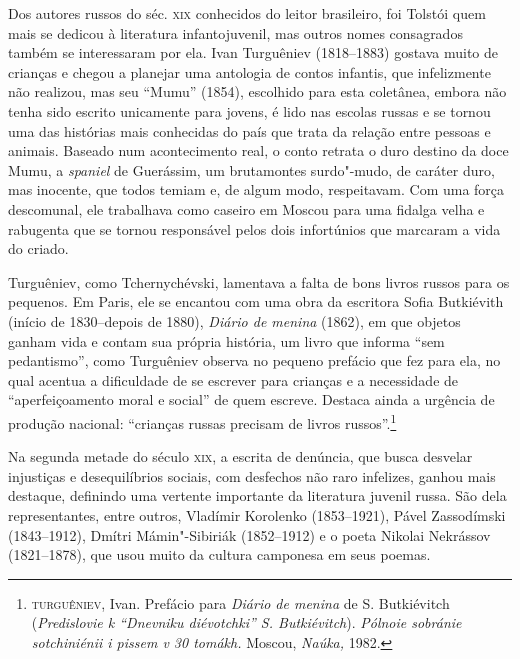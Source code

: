 Dos autores russos do séc. \textsc{xix} conhecidos do leitor brasileiro, foi
Tolstói quem mais se dedicou à literatura infantojuvenil, mas outros
nomes consagrados também se interessaram por ela. Ivan Turguêniev (1818--1883) gostava muito de crianças e chegou a planejar uma antologia de
contos infantis, que infelizmente não realizou, mas seu ``Mumu''
(1854), escolhido para esta coletânea, embora não tenha sido
escrito unicamente para jovens, é lido nas escolas russas e se tornou
uma das histórias mais conhecidas do país que trata da relação entre
pessoas e animais. Baseado num acontecimento real, o conto retrata o duro
destino da doce Mumu, a \emph{spaniel} de Guerássim, um brutamontes
surdo"-mudo, de caráter duro, mas inocente, que todos temiam e, de algum
modo, respeitavam. Com uma força descomunal, ele trabalhava como caseiro
em Moscou para uma fidalga velha e rabugenta que se tornou responsável
pelos dois infortúnios que marcaram a vida do criado.

Turguêniev, como Tchernychévski, lamentava a falta de bons livros russos
para os pequenos. Em Paris, ele se encantou com uma obra da escritora
Sofia Butkiévith (início de 1830--depois de 1880), \emph{Diário de
menina} (1862), em que objetos ganham vida e contam sua própria
história, um livro que informa ``sem pedantismo'', como Turguêniev
observa no pequeno prefácio que fez para ela, no qual acentua a
dificuldade de se escrever para crianças e a necessidade de
``aperfeiçoamento moral e social'' de quem escreve. Destaca ainda a
urgência de produção nacional: ``crianças russas precisam de livros
russos''.\footnote{\textsc{turguêniev}, Ivan. Prefácio para \emph{Diário de menina}
  de S. Butkiévitch (\emph{Predislovie k “Dnevniku diévotchki” S. Butkiévitch}). \emph{Pólnoie sobránie sotchiniénii i pissem v 30 tomákh.} Moscou,
  \emph{Naúka,} 1982.}

Na segunda metade do século \textsc{xix}, a escrita de denúncia, que busca
desvelar injustiças e desequilíbrios sociais, com desfechos não raro
infelizes, ganhou mais destaque, definindo uma vertente importante da
literatura juvenil russa. São dela representantes, entre outros,
Vladímir Korolenko (1853--1921), Pável Zassodímski (1843--1912), Dmítri
Mámin"-Sibiriák (1852--1912) e o poeta Nikolai Nekrássov (1821--1878),
que usou muito da cultura camponesa em seus poemas.

